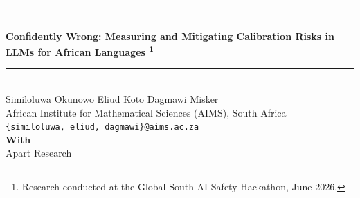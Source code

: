 \documentclass[11pt]{article}
\begin{document}
\begin{center}
{\noindent\rule{\textwidth}{1.4pt}}\\[1em]
{\LARGE\bfseries Confidently Wrong: Measuring and Mitigating Calibration Risks in LLMs for African Languages%
 \footnote{Research conducted at the Global South AI Safety Hackathon, June 2026.}}\\[0.5em]
{\noindent\rule{\textwidth}{0.7pt}}\\[1.2em]
{\large Similoluwa Okunowo \qquad Eliud Koto \qquad Dagmawi Misker}\\[0.4em]
African Institute for Mathematical Sciences (AIMS), South Africa\\[0.15em]
{\small\texttt{\{similoluwa, eliud, dagmawi\}@aims.ac.za}}\\[0.8em]
\textbf{With}\\[2pt] Apart Research
\end{center}
\vspace{0.6em}

\begin{abstract}
\noindent
Large language models (LLMs) are increasingly used in African languages, yet little is known about
whether their confidence remains reliable. This creates a safety risk: models may become less
accurate while remaining highly confident, increasing the likelihood of trusted misinformation. We
evaluate four open-weight LLMs (\textbf{Qwen3-4B-Instruct}, \textbf{Gemma-4-12B},
\textbf{Aya-Expanse-8B}, and \textbf{AfroLlama-V1}) on African-language truthfulness and knowledge
benchmarks (\textbf{Uhura-TruthfulQA} and \textbf{AfriMMLU}), measuring calibration using
log-probability-based confidence estimates. We find that models become increasingly confident in
incorrect answers as they move from English to African languages, creating a systematic
overconfidence problem and a marked increase in expected calibration error. Among three mitigation
strategies, temperature scaling proves most effective, reducing calibration error to near-English
levels without retraining. Our findings suggest that African-language deployment risks stem not only
from lower accuracy, but also from models remaining confident when they are wrong. We show that
simple post-hoc recalibration offers a practical deployment-time safety intervention.
\end{abstract}
\end{document}
